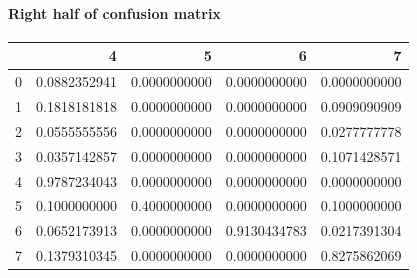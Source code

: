 \paragraph{Right half of confusion matrix}
\begin{tabular}{l|r|r|r|r}
 & 4 & 5 & 6 & 7 \\
\hline
0 & 0.0882352941 & 0.0000000000 & 0.0000000000 & 0.0000000000 \\
1 & 0.1818181818 & 0.0000000000 & 0.0000000000 & 0.0909090909 \\
2 & 0.0555555556 & 0.0000000000 & 0.0000000000 & 0.0277777778 \\
3 & 0.0357142857 & 0.0000000000 & 0.0000000000 & 0.1071428571 \\
4 & 0.9787234043 & 0.0000000000 & 0.0000000000 & 0.0000000000 \\
5 & 0.1000000000 & 0.4000000000 & 0.0000000000 & 0.1000000000 \\
6 & 0.0652173913 & 0.0000000000 & 0.9130434783 & 0.0217391304 \\
7 & 0.1379310345 & 0.0000000000 & 0.0000000000 & 0.8275862069 \\
\end{tabular}

